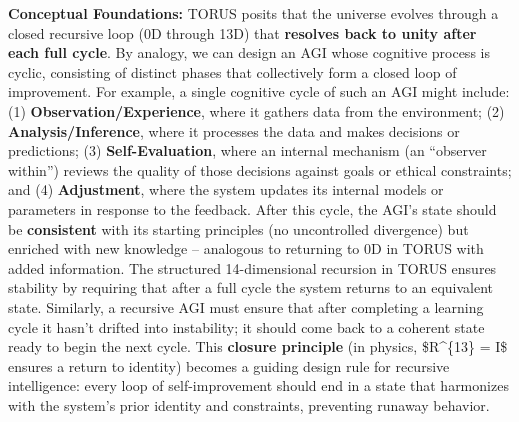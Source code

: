 \documentclass[
]{article}
\begin{document}
{\textbf{Conceptual Foundations:} TORUS posits that the universe evolves
through a closed recursive loop (0D through 13D) that \textbf{resolves
back to unity after each full cycle}. By analogy, we can design an AGI
whose cognitive process is cyclic, consisting of distinct phases that
collectively form a closed loop of improvement. For example, a single
cognitive cycle of such an AGI might include: (1)
\textbf{Observation/Experience}, where it gathers data from the
environment; (2)
\textbf{Analysis/Inference}, where it processes the
data and makes decisions or predictions; (3)
\textbf{Self-Evaluation},
where an internal mechanism (an ``observer within'') reviews the quality
of those decisions against goals or ethical constraints; and (4)
\textbf{Adjustment}, where the system updates its internal models or
parameters in response to the feedback. After this cycle, the AGI's
state should be \textbf{consistent} with its starting principles (no
uncontrolled divergence) but enriched with new knowledge -- analogous to
returning to 0D in TORUS with added information. The structured
14-dimensional recursion in TORUS ensures stability by requiring that
after a full cycle the system returns to an equivalent state. Similarly,
a recursive AGI must ensure that after completing a learning cycle it
hasn't drifted into instability; it should come back to a coherent state
ready to begin the next cycle. This \textbf{closure principle} (in
physics, \$R\^{}\{13\} = I\$ ensures a return to identity) becomes a
guiding design rule for recursive intelligence: every loop of
self-improvement should end in a state that harmonizes with the system's
prior identity and constraints, preventing runaway behavior.

}
\end{document}
